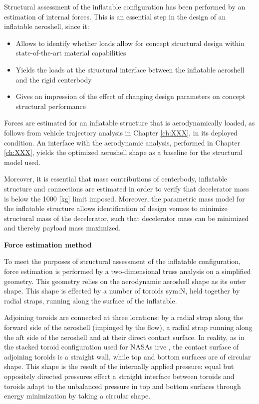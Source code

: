 
Structural assessment of the inflatable configuration has been performed by an estimation of internal forces. This is an essential step in the design of an inflatable aeroshell, since it:
\begin{itemize}
\item Allows to identify whether loads allow for concept structural design within state-of-the-art material capabilities
\item Yields the loads at the structural interface between the inflatable aeroshell and the rigid centerbody
\item Gives an impression of the effect of changing design parameters on concept structural performance
\end{itemize}
Forces are estimated for an inflatable structure that is aerodynamically loaded, as follows from vehicle trajectory analysis in Chapter \ref{ch:XXX}, in its deployed condition. An interface with the aerodynamic analysis, performed in Chapter \ref{ch:XXX}, yields the optimized aeroshell shape as a baseline for the structural model used. 

Moreover, it is essential that mass contributions of centerbody, inflatable structure and connections are estimated in order to verify that decelerator mass is below the 1000 [kg] limit imposed. Moreover, the parametric mass model for the inflatable structure allows identification of design venues to minimize structural mass of the decelerator, such that decelerator mass can be minimized and thereby payload mass maximized. 

\textbf{Force estimation method}

To meet the purposes of structural assessment of the inflatable configuration, force estimation is performed by a two-dimensional truss analysis on a simplified geometry. This geometry relies on the aerodynamic aeroshell shape as its outer shape. This shape is effected by a number of toroids \gls{sym:N}, held together by radial straps, running along the surface of the inflatable. 

Adjoining toroids are connected at three locations: by a radial strap along the forward side of the aeroshell (impinged by the flow), a radial strap running along the aft side of the aeroshell and at their direct contact surface. In reality, as in the stacked toroid configuration used for NASAs \gls{irve} \cite{Lindell2006}, the contact surface of adjoining toroids is a straight wall, while top and bottom surfaces are of circular shape. This shape is the result of the internally applied pressure: equal but oppositely directed pressures effect a straight interface between toroids and toroids adapt to the unbalanced pressure in top and bottom surfaces through energy minimization by taking a circular shape.

